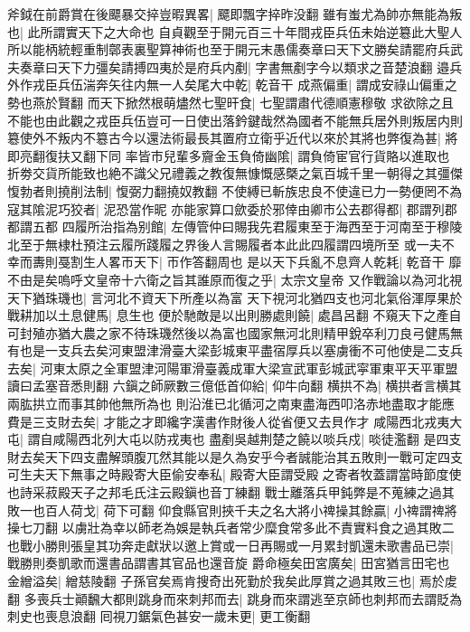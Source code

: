 斧鉞在前爵賞在後飃暴交捽豈暇異畧|{
	飃即飄字捽昨没翻}
雖有蚩尤為帥亦無能為叛也|{
	此所謂實天下之大命也}
自貞觀至于開元百三十年間戎臣兵伍未始逆簒此大聖人所以能柄統輕重制鄣表裏聖算神術也至于開元末愚儒奏章曰天下文勝矣請罷府兵武夫奏章曰天下力彊矣請搏四夷於是府兵内剷|{
	字書無剷字今以類求之音楚浪翻}
邉兵外作戎臣兵伍湍奔矢往内無一人矣尾大中乾|{
	乾音干}
成燕偏重|{
	謂成安祿山偏重之勢也燕於賢翻}
而天下掀然根萌燼然七聖旰食|{
	七聖謂肅代德順憲穆敬}
求欲除之且不能也由此觀之戎臣兵伍豈可一日使出落鈐鍵哉然為國者不能無兵居外則叛居内則簒使外不叛内不簒古今以還法術最長其置府立衛乎近代以來於其將也弊復為甚|{
	將即亮翻復扶又翻下同}
率皆市兒輩多齎金玉負倚幽隂|{
	謂負倚宦官行貨賂以進取也}
折劵交貨所能致也絶不識父兄禮義之教復無慷慨感槩之氣百城千里一朝得之其彊傑愎勃者則撓削法制|{
	愎弼力翻撓奴教翻}
不使縛已斬族忠良不使違已力一勢便罔不為寇其隂泥巧狡者|{
	泥恐當作昵}
亦能家算口歛委於邪倖由卿市公去郡得都|{
	郡謂列郡都謂五都}
四履所治指為别館|{
	左傳管仲曰賜我先君履東至于海西至于河南至于穆陵北至于無棣杜預注云履所踐履之界後人言賜履者本此此四履謂四境所至}
或一夫不幸而夀則戞割生人畧帀天下|{
	帀作答翻周也}
是以天下兵亂不息齊人乾耗|{
	乾音干}
靡不由是矣嗚呼文皇帝十六衛之旨其誰原而復之乎|{
	太宗文皇帝}
又作戰論以為河北視天下猶珠璣也|{
	言河北不資天下所產以為富}
天下視河北猶四支也河北氣俗渾厚果於戰耕加以土息健馬|{
	息生也}
便於馳敵是以出則勝處則饒|{
	處昌呂翻}
不窺天下之產自可封殖亦猶大農之家不待珠璣然後以為富也國家無河北則精甲銳卒利刀良弓健馬無有也是一支兵去矣河東盟津滑臺大梁彭城東平盡宿厚兵以塞虜衝不可他使是二支兵去矣|{
	河東太原之全軍盟津河陽軍滑臺義成軍大梁宣武軍彭城武寜軍東平天平軍盟讀曰孟塞音悉則翻}
六鎭之師厥數三億低首仰給|{
	仰牛向翻}
横拱不為|{
	横拱者言横其兩肱拱立而事其帥他無所為也}
則沿淮已北循河之南東盡海西叩洛赤地盡取才能應費是三支財去矣|{
	才能之才即纔字漢書作財後人從省便又去貝作才}
咸陽西北戎夷大屯|{
	謂自咸陽西北列大屯以防戎夷也}
盡剷吳越荆楚之饒以啖兵戍|{
	啖徒濫翻}
是四支財去矣天下四支盡解頭腹兀然其能以是久為安乎今者誠能治其五敗則一戰可定四支可生夫天下無事之時殿寄大臣偷安奉私|{
	殿寄大臣謂受殿之寄者牧蓋謂當時節度使也詩采菽殿天子之邦毛氏注云殿鎭也音丁練翻}
戰士離落兵甲鈍弊是不蒐練之過其敗一也百人荷戈|{
	荷下可翻}
仰食縣官則挾千夫之名大將小禆操其餘贏|{
	小禆謂禆將操七刀翻}
以虜壯為幸以師老為娛是執兵者常少糜食常多此不責實料食之過其敗二也戰小勝則張皇其功奔走獻狀以邀上賞或一日再賜或一月累封凱還未歌書品已崇|{
	戰勝則奏凱歌而還書品謂書其官品也還音旋}
爵命極矣田宮廣矣|{
	田宮猶言田宅也}
金繒溢矣|{
	繒慈陵翻}
子孫官矣焉肯搜奇出死勤於我矣此厚賞之過其敗三也|{
	焉於䖍翻}
多喪兵士顚飜大都則跳身而來刺邦而去|{
	跳身而來謂逃至京師也刺邦而去謂貶為刺史也喪息浪翻}
囘視刀鋸氣色甚安一歲未更|{
	更工衡翻}
